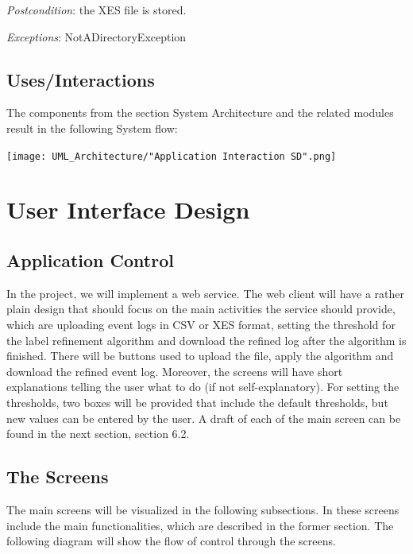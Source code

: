 \documentclass[notitlepage]{article}
\begin{document}
\begin{flushleft}
\textit{Postcondition}: the XES file is stored.

\textit{Exceptions}: NotADirectoryException
\par
\endgroup

\subsection{Uses/Interactions}
The components from the section System Architecture and the related modules result in the following System flow:\\

\begin{landscape}
\texttt{[image: UML\_Architecture/"Application Interaction SD".png]}
\restoregeometry
\end{landscape}

\section{User Interface Design}
\subsection{Application Control}

In the project, we will implement a web service. The web client will have a rather plain design that should focus on the main activities the service should provide, which are uploading event logs in CSV or XES format, setting the threshold for the label refinement algorithm and download the refined log after the algorithm is finished. There will be buttons used to upload the file, apply the algorithm and download the refined event log. Moreover, the screens will have short explanations telling the user what to do (if not self-explanatory). For setting the thresholds, two boxes will be provided that include the default thresholds, but new values can be entered by the user. A draft of each of the main screen can be found in the next section, section 6.2.

\subsection{The Screens}

The main screens will be visualized in the following subsections. In these screens include the main functionalities, which are described in the former section. The following diagram will show the flow of control through the screens.  


\end{flushleft}
\end{document}
